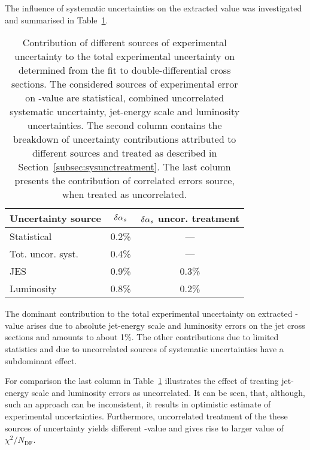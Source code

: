 The influence of systematic uncertainties on the extracted \asz value was investigated and summarised in Table~\ref{tab:asuncbreakdown}.
\begin{table}
\centering
\begin{tabular}{|l|c|c|}
 \hline
 Uncertainty source & $\delta\mbox{$\alpha_{s}$}$ & $\delta\mbox{$\alpha_{s}$}$ uncor. treatment\\
 \hline\hline
 Statistical       & 0.2\% & ---     \\
 Tot. uncor. syst. & 0.4\% & ---     \\
 JES               & 0.9\% & 0.3\%   \\
 Luminosity        & 0.8\% & 0.2\%   \\
 \hline
\end{tabular}
\caption{Contribution of different sources of experimental uncertainty to the total experimental uncertainty on \asz determined from the fit to double-differential cross sections. The considered sources of experimental error on \asz-value are statistical, combined uncorrelated systematic uncertainty, jet-energy scale and luminosity uncertainties. The second column contains the breakdown of uncertainty contributions attributed to different sources and treated as described in Section~\ref{subsec:sysunctreatment}. The last column presents the contribution of correlated errors source, when treated as uncorrelated.}
\label{tab:asuncbreakdown}
\end{table}

The dominant contribution to the total experimental uncertainty on extracted \as-value arises due to absolute jet-energy scale and luminosity errors on the jet cross sections and amounts to about 1\%. The other contributions due to limited statistics and due to uncorrelated sources of systematic uncertainties have a subdominant effect. 

For comparison the last column in Table~\ref{tab:asuncbreakdown} illustrates the effect of treating jet-energy scale and luminosity errors as uncorrelated. It can be seen, that, although, such an approach can be inconsistent, it results in optimistic estimate of experimental uncertainties. Furthermore, uncorrelated treatment of the these sources of uncertainty yields different \as-value and gives rise to larger value of $\chi^2/N_\text{DF}$. 